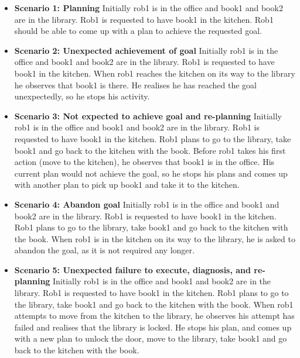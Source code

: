 \documentclass[11pt, oneside]{article}
\begin{document}
\begin{itemize}
\item \textbf{Scenario 1: Planning}\newline
Initially rob1 is in the office and book1 and book2 are in the library.  Rob1 is requested to have book1 in the kitchen. Rob1 should be able to come up with a plan to achieve the requested goal.

\item \textbf{Scenario 2: Unexpected achievement of goal}\newline
Initially rob1 is in the office and book1 and book2 are in the library.  Rob1 is requested to have book1 in the kitchen.  When rob1 reaches the kitchen on its way to the library he observes that book1 is there. He realises he has reached the goal unexpectedly, so he stops his activity.

\item \textbf{Scenario 3: Not expected to achieve goal and re-planning}\newline
Initially rob1 is in the office and book1 and book2 are in the library.  Rob1 is requested to have book1 in the kitchen. Rob1 plans to go to the library, take book1 and go back to the kitchen with the book. Before rob1 takes his first action (move to the kitchen), he observes that book1 is in the office. His current plan would not achieve the goal, so he stops his plans and comes up with another plan to pick up book1  and take it to the kitchen.

\item \textbf{Scenario 4: Abandon goal}\newline
Initially rob1 is in the office and book1 and book2 are in the library.  Rob1 is requested to have book1 in the kitchen.  Rob1 plans to go to the library, take book1 and go back to the kitchen with the book. When rob1 is in the kitchen on its way to the library, he is asked to abandon the goal, as it is not required any longer. 

\item \textbf{Scenario 5: Unexpected failure to execute, diagnosis, and re-planning}\newline
Initially rob1 is in the office and book1 and book2 are in the library.  Rob1 is requested to have book1 in the kitchen.  Rob1 plans to go to the library, take book1 and go back to the kitchen with the book. When rob1 attempts to move from the kitchen to the library, he observes his attempt has failed and realises that the library is locked. He stops his plan, and comes up with a new plan to unlock the door, move to the library,  take book1 and go back to the kitchen with the book.


\end{itemize}
\end{document}
